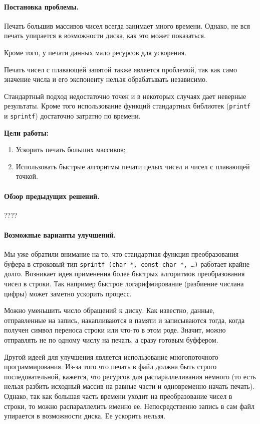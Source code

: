 \documentclass[specialist,subf,href,colorlinks=true,14pt
,times,mtpro,specialist
]{disser}
\begin{document}
\paragraph{Постановка проблемы.}
Печать большив массивов чисел всегда занимает много времени.
Однако, не вся печать упирается в возможности диска, как это может показаться.

Кроме того, у печати данных мало ресурсов для ускорения.

Печать чисел с плавающей запятой также является проблемой, так как само значение числа и его экспоненту нельзя обрабатывать независимо. 

Стандартный подход недостаточно точен и в некоторых случаях дает неверные результаты. 
Кроме того использование функций стандартных библиотек (\texttt{printf} и  \texttt{sprintf}) достаточно затратно по времени.

\textbf{Цели работы:}
\begin{enumerate}
\item Ускорить печать больших массивов;
\item Использовать быстрые алгоритмы печати целых чисел и чисел с плавающей точкой.
\end{enumerate}

\paragraph{Обзор предыдущих решений.} ????
\paragraph{Возможные варианты улучшений.}
Мы уже обратили внимание на то, что стандартная функция преобразования буфера в строковый тип \texttt{sprintf (char *, const char *, \dots)} работает крайне долго. 
Возникает идея применения более быстрых алгоритмов преобразования чисел в строки. 
Так например быстрое логарифмирование (разбиение числана цифры) может заметно ускорить процесс.

Можно уменьшить число обращений к диску.
Как известно, данные, отправленные на запись, накапливаются в памяти и записываются тогда, когда получен символ переноса строки или что-то в этом роде.
Значит, можно отправлять не по одному числу на печать, а сразу готовым буффером.

Другой идеей для улучшения является использование многопоточного программирования. 
Из-за того что печать в файл должна быть строго последовательной, кажется, что ресурсов для распараллеливания немного (то есть нельзя разбить исходный массив на равные части и одновременно начать печать).
Однако, так как большая часть времени уходит на преобразование чисел в строки, то можно распараллелить именно ее.
Непосредственно запись в сам файл упирается в возможности диска. 
Ее ускорить нельзя.
\end{document}
